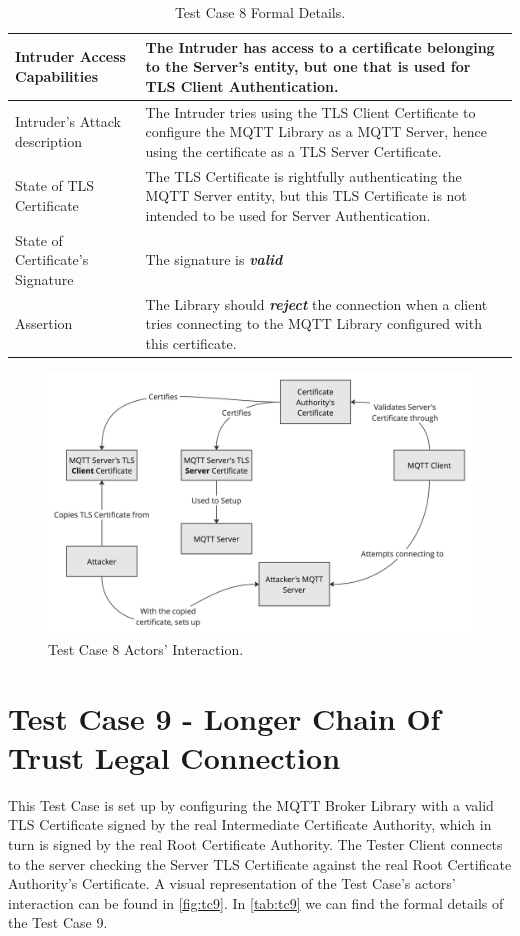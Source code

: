 \documentclass[binding=0.6cm,noexaminfo]{sapthesis}
\begin{document}
\begin{table}
\begin{center}
\begin{tabular}{| p{6cm} | p{6cm} |}
\hline
Intruder Access Capabilities & The Intruder has access to a certificate belonging to the Server’s entity, but one that is used for TLS Client Authentication. \\
\hline
Intruder’s Attack description & The Intruder tries using the TLS Client Certificate to configure the MQTT Library as a MQTT Server, hence using the certificate as a TLS Server Certificate. \\
\hline
State of TLS Certificate & The TLS Certificate is rightfully authenticating the MQTT Server entity, but this TLS Certificate is not intended to be used for Server Authentication. \\
\hline
State of Certificate’s Signature & The signature is \textbf{\textit{valid}} \\
\hline
Assertion & The Library should \textbf{\textit{reject}} the connection when a client tries connecting to the MQTT Library configured with this certificate. \\
\hline
\end{tabular}
\caption{Test Case 8 Formal Details.}
\label{tab:tc8}
\end{center}
\end{table}

\begin{figure}[htb]
	\includegraphics[width=14cm]{TC8}
	\caption{Test Case 8 Actors' Interaction.}
	\label{fig:tc8}
\end{figure}

\section{Test Case 9 - Longer Chain Of Trust Legal Connection}
This Test Case is set up by configuring the MQTT Broker Library with a valid TLS Certificate signed by the real Intermediate Certificate Authority, which in turn is signed by the real Root Certificate Authority. The Tester Client connects to the server checking the Server TLS Certificate against the real Root Certificate Authority’s Certificate. A visual representation of the Test Case's actors' interaction can be found in \autoref{fig:tc9}.  In \autoref{tab:tc9} we can find the formal details of the Test Case 9.
\end{document}
